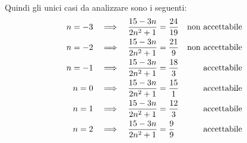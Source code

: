 \begin{soluzione}
    Quindi gli unici casi da analizzare sono i seguenti:
    \begin{align*}
        n = -3 & \quad\Longrightarrow\quad  \dfrac{15 - 3n}{2n^2 + 1} = \dfrac{24}{19} &\text{non accettabile} \\
        n = -2 & \quad\Longrightarrow\quad  \dfrac{15 - 3n}{2n^2 + 1} = \dfrac{21}{9} &\text{non accettabile} \\
        n = -1 & \quad\Longrightarrow\quad  \dfrac{15 - 3n}{2n^2 + 1} = \dfrac{18}{3} &\text{accettabile} \\
        n = 0 & \quad\Longrightarrow\quad  \dfrac{15 - 3n}{2n^2 + 1} = \dfrac{15}{1} &\text{accettabile} \\
        n = 1 & \quad\Longrightarrow\quad  \dfrac{15 - 3n}{2n^2 + 1} = \dfrac{12}{3} &\text{accettabile} \\
        n = 2 & \quad\Longrightarrow\quad  \dfrac{15 - 3n}{2n^2 + 1} = \dfrac{9}{9} &\text{accettabile}
    \end{align*}
\end{soluzione}


